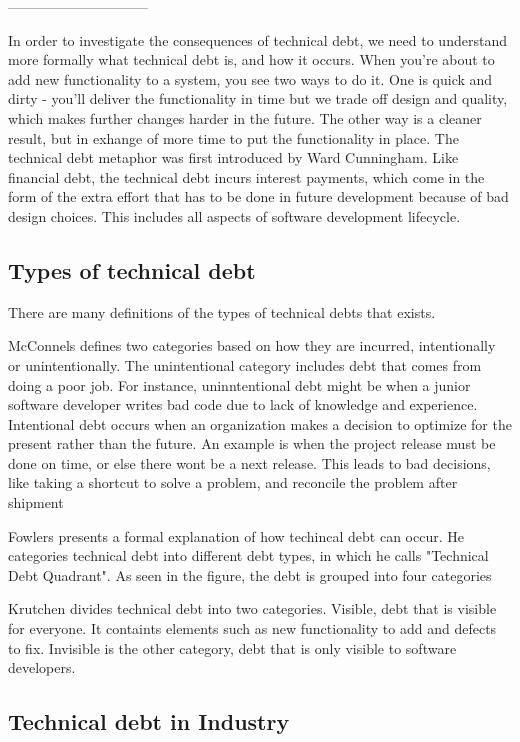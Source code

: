 ------------------------------

In order to investigate the consequences of technical debt, we need to understand more formally what technical debt is, and how it occurs. When you're about to add new functionality to a system, you see two ways to do it. One is quick and dirty - you'll deliver the functionality in time but we trade off design and quality, which makes further changes harder in the future. The other way is a cleaner result, but in exhange of more time to put the functionality in place. The technical debt metaphor was first introduced by Ward Cunningham\cite{cunningham}. Like financial debt, the technical debt incurs interest payments, which come in the form of the extra effort that has to be done in future development because of bad design choices\cite{fowler}. This includes all aspects of software development lifecycle. 

\subsection{Types of technical debt}
There are many definitions of the types of technical debts that exists.


McConnels defines two categories based on how they are incurred, intentionally or unintentionally. The unintentional category includes debt that comes from doing a poor job. For instance, uninntentional debt might be when a junior software developer writes bad code due to lack of knowledge and experience. Intentional debt occurs when an organization makes a decision to optimize for the present rather than the future. An example is when the project release must be done on time, or else there wont be a next release. This leads to bad decisions, like taking a shortcut to solve a problem, and reconcile the problem after shipment

Fowlers presents a formal explanation of how techincal debt can occur. He categories technical debt into different debt types, in which he calls "Technical Debt Quadrant". As seen in the figure, the debt is grouped into four categories

Krutchen divides technical debt into two categories. Visible, debt that is visible for everyone. It containts elements such as new functionality to add and defects to fix. Invisible is the other category, debt that is only visible to software developers.



\subsection{Technical debt in Industry}

